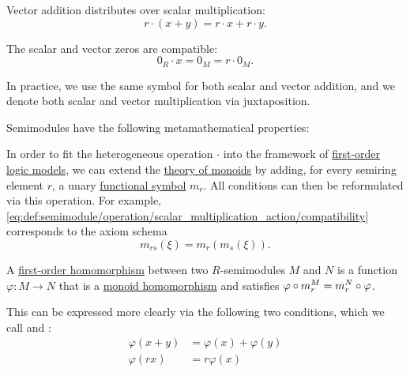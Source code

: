 \begin{definition}
\begin{thmenum}[series=def:semimodule]
\begin{thmenum}
       Vector addition distributes over scalar multiplication:
      \begin{equation}\label{eq:def:semimodule/operation/vector_addition_distributivity}
        r \cdot (x + y) = r \cdot x + r \cdot y.
      \end{equation}

       The scalar and vector zeros are compatible:
      \begin{equation}\label{eq:def:semimodule/operation/absorption}
        0_R \cdot x = 0_M = r \cdot 0_M.
      \end{equation}
    \end{thmenum}

    In practice, we use the same symbol for both scalar and vector addition, and we denote both scalar and vector multiplication via juxtaposition.
  \end{thmenum}

  Semimodules have the following metamathematical properties:
  \begin{thmenum}[resume=def:semimodule]
     In order to fit the heterogeneous operation \( \cdot \) into the framework of \hyperref[def:first_order_semantics/satisfiability]{first-order logic models}, we can extend the \hyperref[def:monoid/theory]{theory of monoids} by adding, for every semiring element \( r \), a unary \hyperref[def:first_order_language/func]{functional symbol} \( m_r \). All conditions can then be reformulated via this operation. For example, \eqref{eq:def:semimodule/operation/scalar_multiplication_action/compatibility} corresponds to the axiom schema
    \begin{equation*}
      m_{rs}(\xi) = m_r(m_s(\xi)).
    \end{equation*}

     A \hyperref[def:first_order_homomorphism]{first-order homomorphism} between two \( R \)-semimodules \( M \) and \( N \) is a function \( \varphi: M \to N \) that is a \hyperref[def:monoid/homomorphism]{monoid homomorphism} and satisfies \( \varphi \bincirc m_r^M = m_r^N \bincirc \varphi \).

    This can be expressed more clearly via the following two conditions, which we call  and :
    \begin{align}
      \varphi(x + y) &= \varphi(x) + \varphi(y) \label{def:semimodule/homomorphism/additive} \\
         \varphi(rx) &= r \varphi(x) \label{def:semimodule/homomorphism/homogeneity}
    \end{align}


\end{thmenum}
\end{definition}

